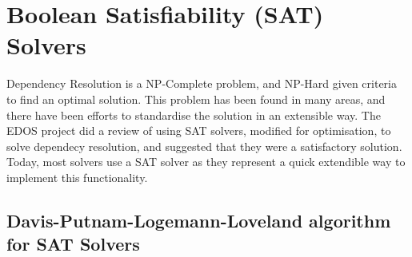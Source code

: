 





\section{Boolean Satisfiability (SAT) Solvers}

Dependency Resolution is a NP-Complete problem, and NP-Hard given criteria to find an optimal solution.
This problem has been found in many areas, and there have been efforts to standardise the solution in an extensible way.
The EDOS project did a review of using SAT solvers, modified for optimisation, to solve dependecy resolution, and suggested that they were a satisfactory solution.
Today, most solvers use a SAT solver as they represent a quick extendible way to implement this functionality.




\subsection{Davis-Putnam-Logemann-Loveland algorithm for SAT Solvers}


